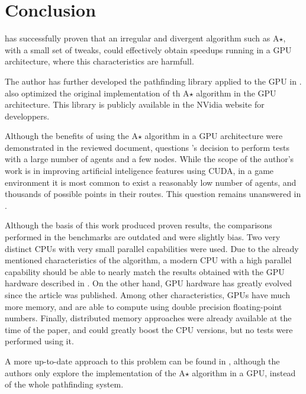 \section{Conclusion}

\cite{bleiweiss08} has successfully proven that an irregular and divergent algorithm such as A$\star$, with a small set of tweaks, could effectively obtain speedups running in a GPU architecture, where this characteristics are harmfull.

The author has further developed the pathfinding library applied to the GPU in \cite{bleiweiss09}. \cite{inam10} also optimized the original implementation of th A$\star$ algorithm in the GPU architecture. This library is publicly available in the NVidia website for developpers.

Although the benefits of using the A$\star$ algorithm in a GPU architecture were demonstrated in the reviewed document, \cite{johansson09} questions \citeauthor{bleiweiss08}'s decision to perform tests with a large number of agents and a few nodes.
While the scope of the author's work is in improving artificial inteligence features using CUDA, in a game environment it is most common to exist a reasonably low number of agents, and thousands of possible points in their routes. This question remains unanswered in \cite{bleiweiss09}.

Although the basis of this work produced proven results, the comparisons performed in the benchmarks are outdated and were slightly bias. Two very distinct CPUs with very small parallel capabilities were used. Due to the already mentioned characteristics of the algorithm, a modern CPU with a high parallel capability should be able to nearly match the results obtained with the GPU hardware described in \cite{bleiweiss08}. On the other hand, GPU hardware has greatly evolved since the article was published. Among other characteristics, GPUs have much more memory, and are able to compute using double precision floating-point numbers. Finally, distributed memory approaches were already available at the time of the paper, and could greatly boost the CPU versions, but no tests were performed using it.

A more up-to-date approach to this problem can be found in \cite{inam10}, although the authors only explore the implementation of the A$\star$ algorithm in a GPU, instead of the whole pathfinding system.